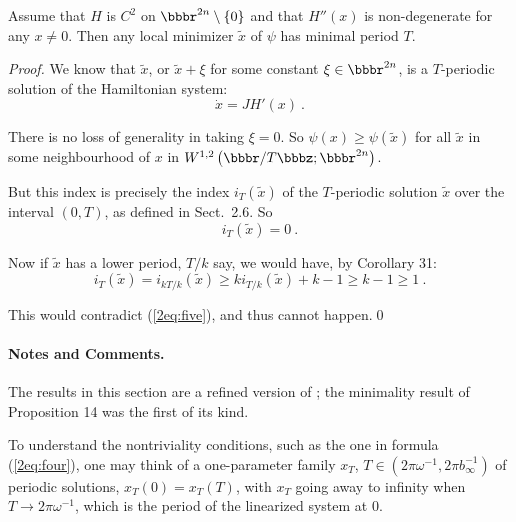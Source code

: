\documentclass{llncs}
\begin{document}
    \begin{lemma}
    Assume that $H$ is $C^{2}$ on $\bbbr^{2n} \setminus \{ 0\}$ and
    that $H'' (x)$ is non-de\-gen\-er\-ate for any $x\ne 0$. Then any local
    minimizer $\widetilde{x}$ of $\psi$ has minimal period $T$.
    \end{lemma}
    \begin{proof}
    We know that $\widetilde{x}$, or
    $\widetilde{x} + \xi$ for some constant $\xi
    \in \bbbr^{2n}$, is a $T$-periodic solution of the Hamiltonian system:
    \begin{equation}
      \dot{x} = JH' (x)\ .
    \end{equation}
    
    There is no loss of generality in taking $\xi = 0$. So
    $\psi (x) \ge \psi (\widetilde{x} )$
    for all $\widetilde{x}$ in some neighbourhood of $x$ in
    $W^{1,2} \left(\bbbr / T\bbbz ; \bbbr^{2n}\right)$.
    
    But this index is precisely the index
    $i_{T} (\widetilde{x} )$ of the $T$-periodic
    solution $\widetilde{x}$ over the interval
    $(0,T)$, as defined in Sect.~2.6. So
    \begin{equation}
      i_{T} (\widetilde{x} ) = 0\ .
      \label{2eq:five}
    \end{equation}
    
    Now if $\widetilde{x}$ has a lower period, $T/k$ say,
    we would have, by Corollary 31:
    \begin{equation}
      i_{T} (\widetilde{x} ) =
      i_{kT/k}(\widetilde{x} ) \ge
      ki_{T/k} (\widetilde{x} ) + k-1 \ge k-1 \ge 1\ .
    \end{equation}
    
    This would contradict (\ref{2eq:five}), and thus cannot happen.\qed
    \end{proof}
    \paragraph{Notes and Comments.}
    The results in this section are a
    refined version of \cite{2clar:eke};
    the minimality result of Proposition
    14 was the first of its kind.
    
    To understand the nontriviality conditions, such as the one in formula
    (\ref{2eq:four}), one may think of a one-parameter family
    $x_{T}$, $T\in \left(2\pi\omega^{-1}, 2\pi b_{\infty}^{-1}\right)$
    of periodic solutions, $x_{T} (0) = x_{T} (T)$,
    with $x_{T}$ going away to infinity when $T\to 2\pi \omega^{-1}$,
    which is the period of the linearized system at 0.
    
\end{document}
